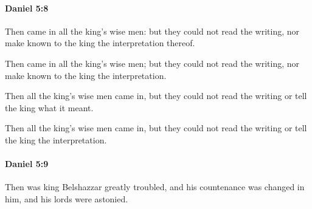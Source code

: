 		\paragraph{Daniel 5:8} %
			\label{DANIEL-5-8}

			Then came in all the king’s wise men: but they could not read the writing, nor make known to the king the interpretation thereof.

			\begin{versebox}
					\item[BHS] 
					\item[LXX] 
					\item[ASV] Then came in all the king's wise men; but they could not read the writing, nor make known to the king the interpretation.
					\item[NIV] Then all the king’s wise men came in, but they could not read the writing or tell the king what it meant.
					\item[NRSV] Then all the king’s wise men came in, but they could not read the writing or tell the king the interpretation.
			\end{versebox}

		\paragraph{Daniel 5:9} %
			\label{DANIEL-5-9}

			Then was king Belshazzar greatly troubled, and his countenance was changed in him, and his lords were astonied.

